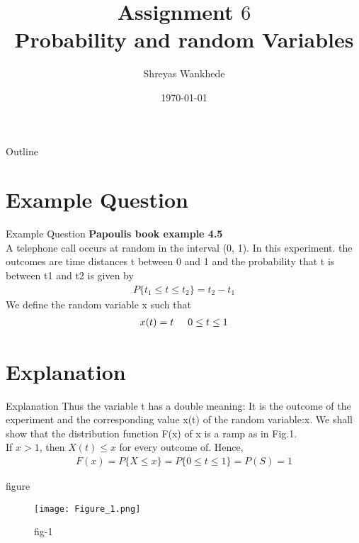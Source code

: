 \documentclass{beamer}
\title{Assignment $6$\\ Probability and random Variables}
\institute{Indian Institute of Technology Hyderabad}
\author{Shreyas Wankhede}
\date{\today}
\begin{document}
\begin{frame}
      \titlepage 
\end{frame} 

\logo{}


\begin{frame}{Outline}
    \tableofcontents
\end{frame}



\section{Example Question}
\begin{frame}{Example Question}
\textbf{Papoulis book example 4.5}\\\vspace{5mm}
A telephone call occurs at random in the interval (0, 1). In this experiment. the
outcomes are time distances t between 0 and 1 and the probability that t is between t1
and t2 is given by 
\begin{align}
   P\{t_1\le t \le t_2\}= t_2 - t_1 \nonumber
\end{align}
We define the random variable x such that
\begin{align}
    x(t) = t \hspace{5mm} 0\le t\le 1 \nonumber
\end{align}

\end{frame}

\section{Explanation}
\begin{frame}{Explanation}
 Thus the variable t has a double meaning: It is the outcome of the experiment and the
corresponding value x(t) of the random variable:x. We shall show that the distribution
function F(x) of x is a ramp as in Fig.1. \\
  If $x>1$, then $X(t) \le x$ for every outcome of. Hence,
  \begin{align}
      F(x) =P\{X\le x\} = P\{ 0\le t \le 1\}= P(S) =1 \nonumber
  \end{align}
\end{frame} 

\begin{frame}{figure}
       \begin{figure}
              \texttt{[image: Figure\_1.png]}
              \caption{fig-1}
              \label{fiure-1}
            \end{figure}
\end{frame}
\end{document}
